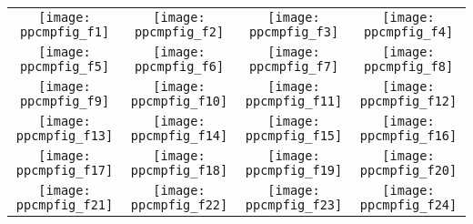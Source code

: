 \documentclass{sig-alternate}
\begin{document}
\begin{figure*}
\centering
\begin{tabular}{@{}c@{}c@{}c@{}c@{}}
\texttt{[image: ppcmpfig\_f1]}&
\texttt{[image: ppcmpfig\_f2]}&
\texttt{[image: ppcmpfig\_f3]}&
\texttt{[image: ppcmpfig\_f4]}\\
\texttt{[image: ppcmpfig\_f5]}&
\texttt{[image: ppcmpfig\_f6]}&
\texttt{[image: ppcmpfig\_f7]}&
\texttt{[image: ppcmpfig\_f8]}\\
\texttt{[image: ppcmpfig\_f9]}&
\texttt{[image: ppcmpfig\_f10]}&
\texttt{[image: ppcmpfig\_f11]}&
\texttt{[image: ppcmpfig\_f12]}\\
\texttt{[image: ppcmpfig\_f13]}&
\texttt{[image: ppcmpfig\_f14]}&
\texttt{[image: ppcmpfig\_f15]}&
\texttt{[image: ppcmpfig\_f16]}\\
\texttt{[image: ppcmpfig\_f17]}&
\texttt{[image: ppcmpfig\_f18]}&
\texttt{[image: ppcmpfig\_f19]}&
\texttt{[image: ppcmpfig\_f20]}\\
\texttt{[image: ppcmpfig\_f21]}&
\texttt{[image: ppcmpfig\_f22]}&
\texttt{[image: ppcmpfig\_f23]}&
\texttt{[image: ppcmpfig\_f24]}

\end{tabular}
\end{figure*}
\end{document}
